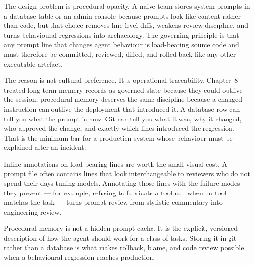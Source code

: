 The design problem is procedural opacity. A naive team stores system prompts in a database table or an admin console because prompts look like content rather than code, but that choice removes line-level diffs, weakens review discipline, and turns behavioural regressions into archaeology. The governing principle is that any prompt line that changes agent behaviour is load-bearing source code and must therefore be committed, reviewed, diffed, and rolled back like any other executable artefact.

The reason is not cultural preference. It is operational traceability. Chapter~8 treated long-term memory records as governed state because they could outlive the session; procedural memory deserves the same discipline because a changed instruction can outlive the deployment that introduced it. A database row can tell you what the prompt is now. Git can tell you what it was, why it changed, who approved the change, and exactly which lines introduced the regression. That is the minimum bar for a production system whose behaviour must be explained after an incident.

Inline annotations on load-bearing lines are worth the small visual cost. A prompt file often contains lines that look interchangeable to reviewers who do not spend their days tuning models. Annotating those lines with the failure modes they prevent --- for example, refusing to fabricate a tool call when no tool matches the task --- turns prompt review from stylistic commentary into engineering review.

\begin{notebox}
Procedural memory is not a hidden prompt cache. It is the explicit, versioned description of how the agent should work for a class of tasks. Storing it in git rather than a database is what makes rollback, blame, and code review possible when a behavioural regression reaches production.
\end{notebox}

